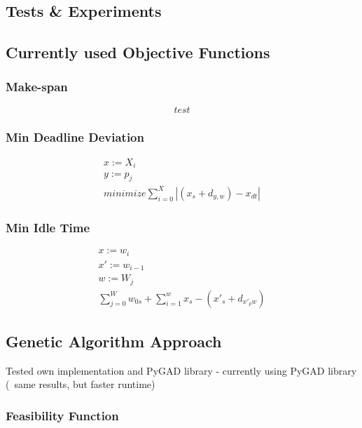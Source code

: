 \documentclass[a4paper,12pt,twoside]{scrreprt}
\begin{document}
\begin{flushleft}
\section{Tests \& Experiments}

\subsection{Currently used Objective Functions}

\subsubsection{Make-span}
\begin{equation}
	\label{makespan}
	test	
\end{equation}

\subsubsection{Min Deadline Deviation}
\begin{equation}
	\label{min_deadline_deviation}
	\begin{split}
		x := X_{i} \\
		y := p_{j} \\
		minimize \sum_{i=0}^{X} |(x_{s} + d_{y,w}) - x_{dt}|
	\end{split}
\end{equation}

\subsubsection{Min Idle Time}
\begin{equation}
	\label{min_idle_time}
	\begin{split}
		x := w_{i}\\
		x' := w_{i-1}\\
		w := W_{j} \\
		\sum_{j=0}^{W} w_{0s} + \sum_{i=1}^{w} x_{s} - (x'_{s} + d_{x'_{p}w})
	\end{split}
\end{equation}

\subsection{Genetic Algorithm Approach}
Tested own implementation and PyGAD library - currently using PyGAD library (~same results, but faster runtime)

\subsubsection{Feasibility Function}


\end{flushleft}
\end{document}

